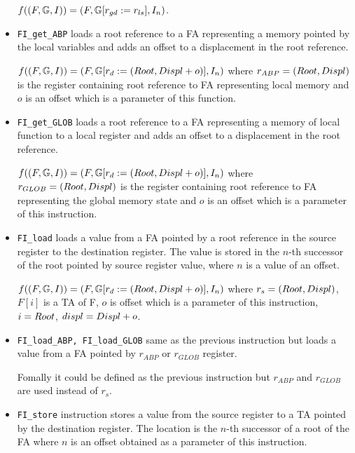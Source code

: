 \begin{itemize}
		$f((F, \mathbb{G}, I)) = (F, \mathbb{G} [r_{gd} := r_{ls}], I_n)$.
	
	\item {\tt FI\_get\_ABP} loads a root reference to a FA representing
		a memory pointed by the local variables and adds an offset to a displacement
		in the root reference.
		
		$f((F, \mathbb{G}, I)) = (F, \mathbb{G} [r_d := 
			(Root,Displ + o)], I_n)$ where $r_{ABP}=(Root,Displ)$ is the register containing root
		reference to FA representing local memory and $o$ is an offset
		which is a parameter of this function.
	
	\item {\tt FI\_get\_GLOB} loads a root reference to a FA representing
		a memory of local function to a local register
		and adds an offset to a displacement in the root reference.
		
		$f((F, \mathbb{G}, I)) = (F, \mathbb{G} [r_{d} := 
				(Root,Displ + o)
			], I_n)$ where $r_{GLOB}=(Root,Displ)$ is the register containing root
			reference to FA representing the global memory state and $o$ is an offset
			which is a parameter of this instruction.
	
	\item {\tt FI\_load} loads a value from a FA pointed
		by a root reference in the source register to the destination register.
		The value is stored in the $n$-th successor of the root pointed
		by source register value, where $n$ is a value of an offset.
		
		$f((F, \mathbb{G}, I)) = (F, \mathbb{G} [r_{d} := 
				(Root,Displ + o)
			], I_n)$
			where $r_{s}=(Root,Displ)$,
			$F[i]$ is a TA of F,
			$o$ is offset which is a parameter of this instruction,
			$i=Root$,
			$displ=Displ + o$.
	
	\item {\tt FI\_load\_ABP, FI\_load\_GLOB} same as the previous instruction
		but loads a value from a FA pointed by $r_{ABP}$ or $r_{GLOB}$ register.
		
		Fomally it could be defined as the previous instruction but
		$r_{ABP}$ and $r_{GLOB}$ are used instead of $r_s$.
	
	\item {\tt FI\_store} instruction stores a value from the source register
		to a TA pointed by the destination register.
		The location is the $n$-th successor of a root of the FA where $n$ is an offset
		obtained as a parameter of this instruction.
		

\end{itemize}
